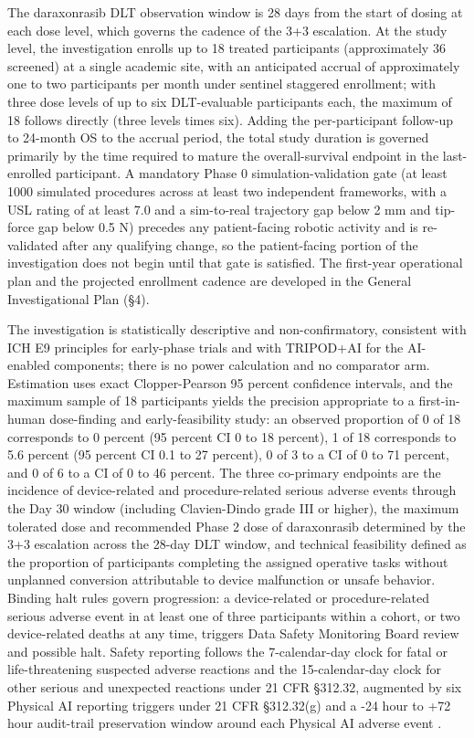 The daraxonrasib DLT observation window is 28 days from the start of dosing at each
dose level, which governs the cadence of the 3+3 escalation. At the study level, the
investigation enrolls up to 18 treated participants (approximately 36 screened) at a
single academic site, with an anticipated accrual of approximately one to two
participants per month under sentinel staggered enrollment; with three dose levels
of up to six DLT-evaluable participants each, the maximum of 18 follows directly
(three levels times six). Adding the per-participant follow-up to 24-month OS to the
accrual period, the total study duration is governed primarily by the time required
to mature the overall-survival endpoint in the last-enrolled participant. A
mandatory Phase 0 simulation-validation gate (at least 1000 simulated procedures
across at least two independent frameworks, with a USL rating of at least 7.0 and a
sim-to-real trajectory gap below 2 mm and tip-force gap below 0.5 N) precedes any
patient-facing robotic activity and is re-validated after any qualifying change, so
the patient-facing portion of the investigation does not begin until that gate is
satisfied. The first-year operational plan and the projected enrollment cadence are
developed in the General Investigational Plan (\S 4).

The investigation is statistically descriptive and non-confirmatory, consistent with
ICH E9 principles for early-phase trials and with TRIPOD+AI for the AI-enabled
components; there is no power calculation and no comparator arm. Estimation uses
exact Clopper-Pearson 95 percent confidence intervals, and the maximum sample of 18
participants yields the precision appropriate to a first-in-human dose-finding and
early-feasibility study: an observed proportion of 0 of 18 corresponds to 0 percent
(95 percent CI 0 to 18 percent), 1 of 18 corresponds to 5.6 percent (95 percent CI
0.1 to 27 percent), 0 of 3 to a CI of 0 to 71 percent, and 0 of 6 to a CI of 0 to 46
percent. The three co-primary endpoints are the incidence of device-related and
procedure-related serious adverse events through the Day 30 window (including
Clavien-Dindo grade III or higher), the maximum tolerated dose and recommended Phase
2 dose of daraxonrasib determined by the 3+3 escalation across the 28-day DLT window,
and technical feasibility defined as the proportion of participants completing the
assigned operative tasks without unplanned conversion attributable to device
malfunction or unsafe behavior. Binding halt rules govern progression: a
device-related or procedure-related serious adverse event in at least one of three
participants within a cohort, or two device-related deaths at any time, triggers Data
Safety Monitoring Board review and possible halt. Safety reporting follows the
7-calendar-day clock for fatal or life-threatening suspected adverse reactions and
the 15-calendar-day clock for other serious and unexpected reactions under 21 CFR
\S 312.32, augmented by six Physical AI reporting triggers under 21 CFR \S 312.32(g)
and a -24 hour to +72 hour audit-trail preservation window around each Physical AI
adverse event \cite{phase1guidance, cfr312paiuni}.


